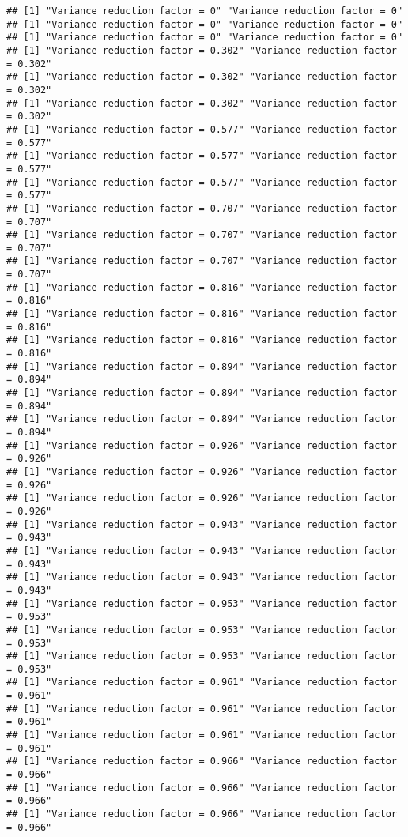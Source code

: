 \documentclass[
]{article}
\begin{document}
\begin{verbatim}
## [1] "Variance reduction factor = 0" "Variance reduction factor = 0"
## [1] "Variance reduction factor = 0" "Variance reduction factor = 0"
## [1] "Variance reduction factor = 0" "Variance reduction factor = 0"
## [1] "Variance reduction factor = 0.302" "Variance reduction factor = 0.302"
## [1] "Variance reduction factor = 0.302" "Variance reduction factor = 0.302"
## [1] "Variance reduction factor = 0.302" "Variance reduction factor = 0.302"
## [1] "Variance reduction factor = 0.577" "Variance reduction factor = 0.577"
## [1] "Variance reduction factor = 0.577" "Variance reduction factor = 0.577"
## [1] "Variance reduction factor = 0.577" "Variance reduction factor = 0.577"
## [1] "Variance reduction factor = 0.707" "Variance reduction factor = 0.707"
## [1] "Variance reduction factor = 0.707" "Variance reduction factor = 0.707"
## [1] "Variance reduction factor = 0.707" "Variance reduction factor = 0.707"
## [1] "Variance reduction factor = 0.816" "Variance reduction factor = 0.816"
## [1] "Variance reduction factor = 0.816" "Variance reduction factor = 0.816"
## [1] "Variance reduction factor = 0.816" "Variance reduction factor = 0.816"
## [1] "Variance reduction factor = 0.894" "Variance reduction factor = 0.894"
## [1] "Variance reduction factor = 0.894" "Variance reduction factor = 0.894"
## [1] "Variance reduction factor = 0.894" "Variance reduction factor = 0.894"
## [1] "Variance reduction factor = 0.926" "Variance reduction factor = 0.926"
## [1] "Variance reduction factor = 0.926" "Variance reduction factor = 0.926"
## [1] "Variance reduction factor = 0.926" "Variance reduction factor = 0.926"
## [1] "Variance reduction factor = 0.943" "Variance reduction factor = 0.943"
## [1] "Variance reduction factor = 0.943" "Variance reduction factor = 0.943"
## [1] "Variance reduction factor = 0.943" "Variance reduction factor = 0.943"
## [1] "Variance reduction factor = 0.953" "Variance reduction factor = 0.953"
## [1] "Variance reduction factor = 0.953" "Variance reduction factor = 0.953"
## [1] "Variance reduction factor = 0.953" "Variance reduction factor = 0.953"
## [1] "Variance reduction factor = 0.961" "Variance reduction factor = 0.961"
## [1] "Variance reduction factor = 0.961" "Variance reduction factor = 0.961"
## [1] "Variance reduction factor = 0.961" "Variance reduction factor = 0.961"
## [1] "Variance reduction factor = 0.966" "Variance reduction factor = 0.966"
## [1] "Variance reduction factor = 0.966" "Variance reduction factor = 0.966"
## [1] "Variance reduction factor = 0.966" "Variance reduction factor = 0.966"

\end{verbatim}
\end{document}
